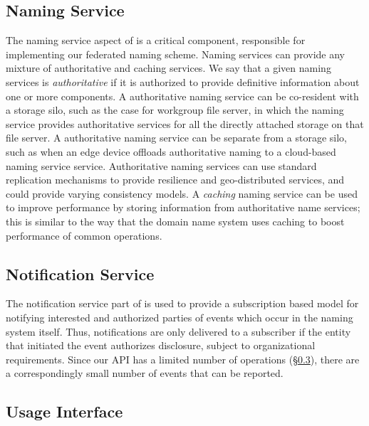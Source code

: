 \subsection{Naming Service}
\label{sec:arch:naming}

The naming service aspect of \system is a critical component, responsible for implementing our federated naming scheme.  Naming services can provide any mixture of authoritative and caching services.  We say that a given naming services is \textit{authoritative} if it is authorized to provide definitive information about one or more components.  A \system authoritative naming service can be co-resident with a storage silo, such as the case for workgroup file server, in which the naming service provides authoritative services for all the directly attached storage on that file server. A \system authoritative naming service can be separate from a storage silo, such as when an edge device offloads authoritative naming to a cloud-based naming service service. Authoritative naming services can use standard replication mechanisms to provide resilience and geo-distributed services, and could provide varying consistency models.  A \textit{caching} naming service can be used to improve performance by storing information from authoritative name services; this is similar to the way that the domain name system uses caching to boost performance of common operations.

\subsection{Notification Service}
\label{sec:arch:notification}

The notification service part of \system is used to provide a subscription based model for notifying interested and authorized parties of events which occur in the naming system itself. Thus, notifications are only delivered to a subscriber if the entity that initiated the event authorizes disclosure, subject to organizational requirements.  Since our API has a limited number of operations (\S \ref{sec:arch:api}), there are a correspondingly small number of events that can be reported.

\subsection{Usage Interface}
\label{sec:arch:api}

